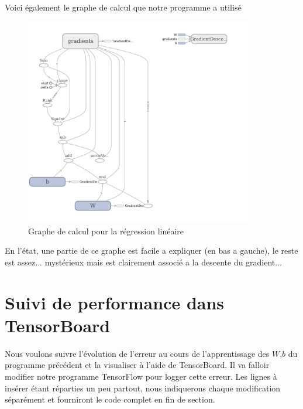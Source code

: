\documentclass[a4paper,11pt]{book}
\begin{document}
Voici également le graphe de calcul que notre programme a utilisé
\begin{figure}[H]

\begin{center}
\includegraphics[width=10cm]{./figures/graphRegressionLineaire.png} 
\end{center}
\caption{Graphe de calcul pour la régression linéaire}
\end{figure}

En l'état, une partie de ce graphe est facile a expliquer (en bas a gauche), le reste est assez... mystérieux mais est clairement associé a la descente du gradient...

\section{Suivi de performance dans TensorBoard}
Nous voulons suivre l’évolution de l'erreur au cours de l'apprentissage des $W$,$b$ du programme précédent et la visualiser à l'aide de TensorBoard.
Il va falloir modifier notre programme TensorFlow pour logger cette erreur. Les lignes à insérer étant réparties un peu partout, nous indiquerons chaque modification séparément et fourniront le code complet en fin de section.
\end{document}
